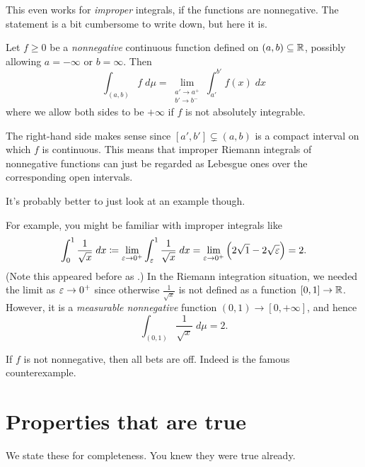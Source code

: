 This even works for \emph{improper} integrals,
if the functions are nonnegative.
The statement is a bit cumbersome to write down, but here it is.
\begin{theorem}
	Let $f \ge 0$ be a \emph{nonnegative}
	continuous function defined on $(a,b) \subseteq \mathbb R$,
	possibly allowing $a = -\infty$ or $b = \infty$.
	Then
	\[ \int_{(a,b)} f \; d\mu
		= \lim_{\substack{a' \to a^+ \\ b' \to b^-}}
		\int_{a'}^{b'} f(x) \; dx \]
	where we allow both sides to be $+\infty$
	if $f$ is not absolutely integrable.
\end{theorem}
The right-hand side makes sense since $[a',b'] \subsetneq (a,b)$
is a compact interval on which $f$ is continuous.
This means that improper Riemann integrals of nonnegative
functions can just be regarded as Lebesgue ones
over the corresponding open intervals.

It's probably better to just look at an example though.
\begin{example}
	For example, you might be familiar with improper integrals like
	\[ \int_0^1 \frac{1}{\sqrt x} \; dx
		\coloneqq \lim_{\varepsilon \to 0^+}
		\int_\varepsilon^1 \frac{1}{\sqrt x} \; dx
		= \lim_{\varepsilon \to 0^+} \left( 2\sqrt{1} - 2\sqrt{\varepsilon} \right) = 2.
	\]
	(Note this appeared before as .)
	In the Riemann integration situation, we needed the limit as $\varepsilon \to 0^+$
	since otherwise $\frac{1}{\sqrt x}$ is not defined as a function $[0,1] \to \mathbb R$.
	However, it is a \emph{measurable nonnegative}
	function $(0,1) \to [0,+\infty]$,
	and hence
	\[ \int_{(0,1)} \frac{1}{\sqrt x} \; d\mu = 2. \]
\end{example}

If $f$ is not nonnegative, then all bets are off.
Indeed  is the famous counterexample.

\section{Properties that are true}
We state these for completeness.
You knew they were true already.

